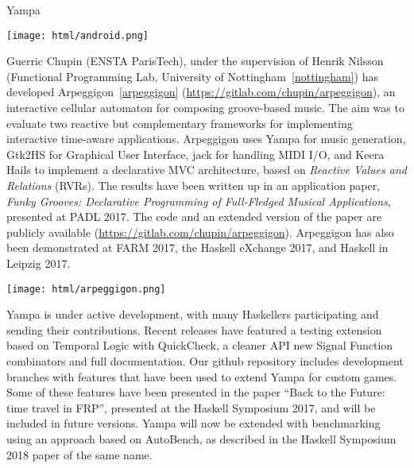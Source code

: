 \begin{hcarentry}[updated]{Yampa}
\begin{center}
\texttt{[image: html/android.png]}
\end{center}

Guerric Chupin (ENSTA ParisTech), under the supervision of Henrik Nilsson
(Functional Programming Lab, University of Nottingham~\cref{nottingham}) has
developed Arpeggigon~\cref{arpeggigon}
(\href{https://gitlab.com/chupin/arpeggigon}{https://gitlab.com/chupin/arpeggigon}),
an interactive cellular automaton for composing groove-based music. The aim
was to evaluate two reactive but complementary frameworks for implementing
interactive time-aware applications. Arpeggigon uses Yampa for music
generation, Gtk2HS for Graphical User Interface, jack for handling MIDI I/O,
and Keera Hails to implement a declarative MVC architecture, based on
\emph{Reactive Values and Relations} (RVRs). The results have been written up
in an application paper, \emph{Funky Grooves: Declarative Programming of
Full-Fledged Musical Applications}, presented at PADL 2017. The code and an
extended version of the paper are publicly available
(\href{https://gitlab.com/chupin/arpeggigon}{https://gitlab.com/chupin/arpeggigon}).
Arpeggigon has also been demonstrated at FARM 2017, the Haskell eXchange 2017,
and Haskell in Leipzig 2017.

\begin{center}
  \texttt{[image: html/arpeggigon.png]}
\end{center}

Yampa is under active development, with many Haskellers participating and
sending their contributions. Recent releases have featured a testing extension
based on Temporal Logic with QuickCheck, a cleaner API
new Signal Function combinators and
full documentation. Our github repository includes development
branches with features that have been used to extend Yampa for custom games.
Some of these features have been presented in the paper ``Back to the Future:
time travel in FRP'', presented at the Haskell Symposium 2017, and will be
included in future versions. Yampa will now be extended with benchmarking
using an approach based on AutoBench, as described in the Haskell
Symposium 2018 paper of the same name.


\end{hcarentry}
